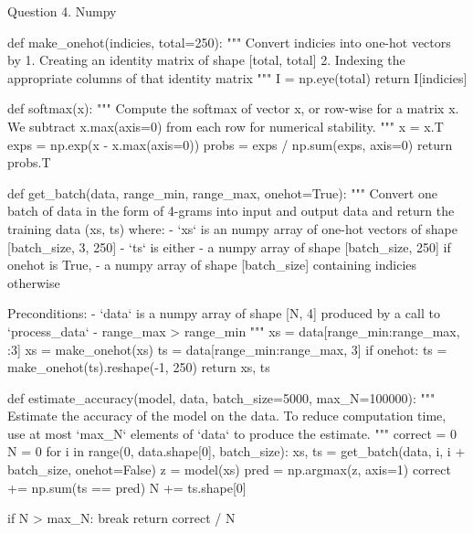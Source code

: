 \documentclass[12pt]{article}
\begin{document}
Question 4. Numpy\\
\begin{python}
def make_onehot(indicies, total=250):
    """
    Convert indicies into one-hot vectors by
        1. Creating an identity matrix of shape [total, total]
        2. Indexing the appropriate columns of that identity matrix
    """
    I = np.eye(total)
    return I[indicies]

def softmax(x):
    """
    Compute the softmax of vector x, or row-wise for a matrix x.
    We subtract x.max(axis=0) from each row for numerical stability.
    """
    x = x.T
    exps = np.exp(x - x.max(axis=0))
    probs = exps / np.sum(exps, axis=0)
    return probs.T

def get_batch(data, range_min, range_max, onehot=True):
    """
    Convert one batch of data in the form of 4-grams into input and output
    data and return the training data (xs, ts) where:
     - `xs` is an numpy array of one-hot vectors of shape [batch_size, 3, 250]
     - `ts` is either
            - a numpy array of shape [batch_size, 250] if onehot is True,
            - a numpy array of shape [batch_size] containing indicies otherwise

    Preconditions:
     - `data` is a numpy array of shape [N, 4] produced by a call
        to `process_data`
     - range_max > range_min
    """
    xs = data[range_min:range_max, :3]
    xs = make_onehot(xs)
    ts = data[range_min:range_max, 3]
    if onehot:
        ts = make_onehot(ts).reshape(-1, 250)
    return xs, ts

def estimate_accuracy(model, data, batch_size=5000, max_N=100000):
    """
    Estimate the accuracy of the model on the data. To reduce
    computation time, use at most `max_N` elements of `data` to
    produce the estimate.
    """
    correct = 0
    N = 0
    for i in range(0, data.shape[0], batch_size):
        xs, ts = get_batch(data, i, i + batch_size, onehot=False)
        z = model(xs)
        pred = np.argmax(z, axis=1)
        correct += np.sum(ts == pred)
        N += ts.shape[0]

        if N > max_N:
            break
    return correct / N
\end{python}
\end{document}
